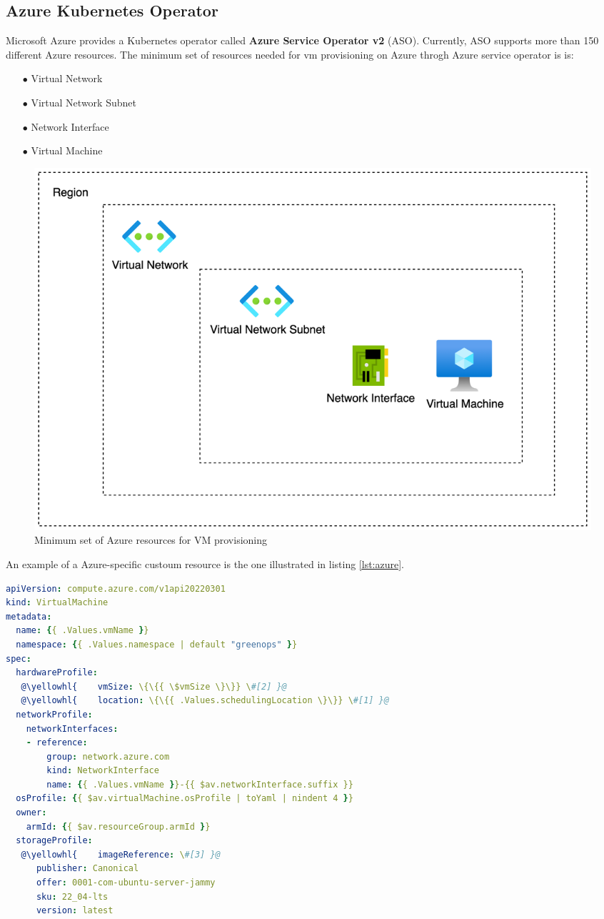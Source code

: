\subsection{Azure Kubernetes Operator}

Microsoft Azure provides a Kubernetes operator called \textbf{Azure Service Operator v2} (ASO).
Currently, ASO supports more than 150 different Azure resources.
The minimum set of resources needed for vm provisioning on Azure throgh Azure service operator is is:

\begin{itemize}[itemsep=0.2pt, topsep=1pt] 
\item[$\bullet$] Virtual Network 
\item[$\bullet$] Virtual Network Subnet
\item[$\bullet$] Network Interface
\item[$\bullet$] Virtual Machine
\end{itemize}

\begin{figure}[H]
\centering
\includegraphics[width=0.75\linewidth]{images/azure.png}
\caption{Minimum set of Azure resources for VM provisioning}
\label{fig:azure}
\end{figure}


An example of a Azure-specific custoum resource is the one illustrated in listing \ref{lst:azure}. \\

\begin{lstlisting}[language=yaml, caption={Azure Instance Custom Resource}, label={lst:azure}]
apiVersion: compute.azure.com/v1api20220301
kind: VirtualMachine
metadata:
  name: {{ .Values.vmName }}
  namespace: {{ .Values.namespace | default "greenops" }}
spec:
  hardwareProfile:
   @\yellowhl{    vmSize: \{\{{ \$vmSize \}\}} \#[2] }@
   @\yellowhl{    location: \{\{{ .Values.schedulingLocation \}\}} \#[1] }@
  networkProfile:
    networkInterfaces:
    - reference:
        group: network.azure.com
        kind: NetworkInterface
        name: {{ .Values.vmName }}-{{ $av.networkInterface.suffix }}
  osProfile: {{ $av.virtualMachine.osProfile | toYaml | nindent 4 }}
  owner:
    armId: {{ $av.resourceGroup.armId }}
  storageProfile:
   @\yellowhl{    imageReference: \#[3] }@
      publisher: Canonical
      offer: 0001-com-ubuntu-server-jammy
      sku: 22_04-lts
      version: latest
\end{lstlisting}

